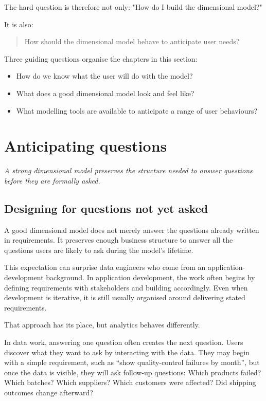 \documentclass[10pt,openany,10pt]{book}
\providecommand{\tightlist}{%
  \setlength{\itemsep}{0pt}\setlength{\parskip}{0pt}}
\begin{document}
The hard question is therefore not only: "How do I build the dimensional
model?"

It is also:

\begin{quote}
How should the dimensional model behave to anticipate user needs?
\end{quote}

Three guiding questions organise the chapters in this section:

\begin{itemize}
\tightlist
\item
  How do we know what the user will do with the model?
\item
  What does a good dimensional model look and feel like?
\item
  What modelling tools are available to anticipate a range of user
  behaviours?
\end{itemize}

\newpage

\chapter{Anticipating
questions}\label{docs-presenting-insights-anticipating-questions}

\emph{A strong dimensional model preserves the structure needed to
answer questions before they are formally asked.}

\section{Designing for questions not yet
asked}\label{designing-for-questions-not-yet-asked}

A good dimensional model does not merely answer the questions already
written in requirements. It preserves enough business structure to
answer all the questions users are likely to ask during the model's
lifetime.

This expectation can surprise data engineers who come from an
application-development background. In application development, the work
often begins by defining requirements with stakeholders and building
accordingly. Even when development is iterative, it is still usually
organised around delivering stated requirements.

That approach has its place, but analytics behaves differently.

In data work, answering one question often creates the next question.
Users discover what they want to ask by interacting with the data. They
may begin with a simple requirement, such as ``show quality-control
failures by month'', but once the data is visible, they will ask
follow-up questions: Which products failed? Which batches? Which
suppliers? Which customers were affected? Did shipping outcomes change
afterward?
\end{document}
